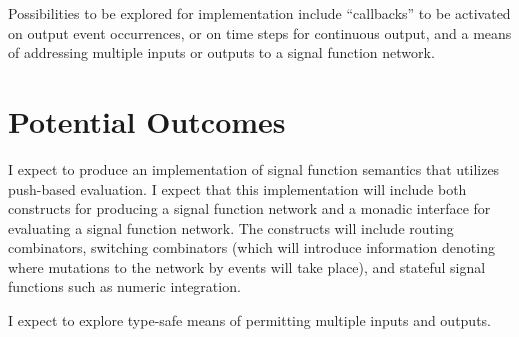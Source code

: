 \documentclass[11pt]{artikel3}
\begin{document}
Possibilities to be explored for implementation include ``callbacks'' to be activated on output event occurrences, or on time
steps for continuous output, and a means of addressing multiple inputs or outputs to a signal function network.

\section{Potential Outcomes}

I expect to produce an implementation of signal function semantics that utilizes push-based evaluation. I expect that this implementation will include both constructs for producing a signal function network and a monadic interface for evaluating a signal function network. The constructs will include routing combinators, switching combinators (which will introduce information denoting where mutations to the network by events will take place), and stateful signal functions such as
numeric integration.

I expect to explore type-safe means of permitting multiple inputs and outputs.

{}

\end{document}
